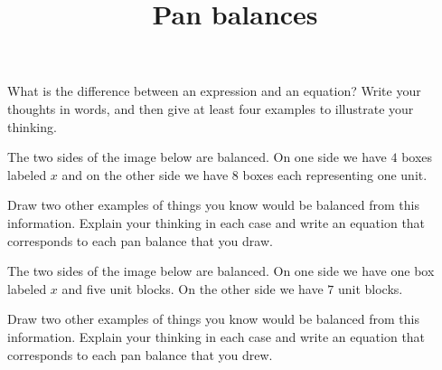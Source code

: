 \documentclass[nooutcomes,noauthor,handout]{ximera}
\title{Pan balances}
\begin{document}
\begin{abstract}
\end{abstract}

\maketitle

\begin{problem}
What is the difference between an expression and an equation? Write your thoughts in words, and then give at least four examples to illustrate your thinking. 
\end{problem}




\begin{problem}
The two sides of the image below are balanced. On one side we have $4$ boxes labeled $x$ and on the other side we have $8$ boxes each representing one unit.
\begin{image}
\end{image}

Draw two other examples of things you know would be balanced from this information. Explain your thinking in each case and write an equation that corresponds to each pan balance that you draw. 
\end{problem}



\begin{problem}
The two sides of the image below are balanced. On one side we have one box labeled $x$ and five unit blocks. On the other side we have $7$ unit blocks.
\begin{image}
\end{image}

Draw two other examples of things you know would be balanced from this information. Explain your thinking in each case and write an equation that corresponds to each pan balance that you drew. 
\end{problem}
\end{document}
